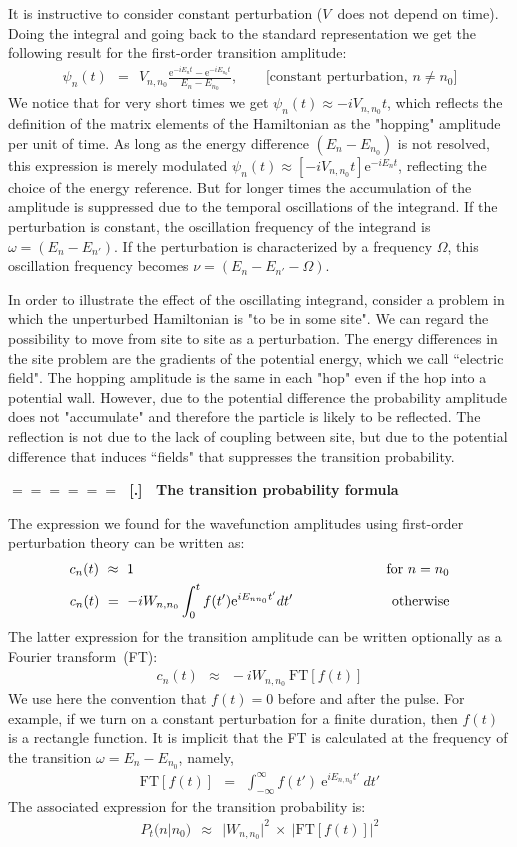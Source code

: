 \documentclass[onecolumn,fleqn]{revtex4}
\newcommand{\eexp}{\mathrm{e}^}
\newcommand{\beq}{\begin{eqnarray}}
\newcommand{\eeq}{\end{eqnarray}}
\renewcommand{\thesubsection}{\arabic{subsection}}
\renewcommand{\thesubsubsection}{\arabic{subsubsection}}
\newcommand{\sheadC}[1]
{
\addtocounter{subsubsection}{1}
\vspace{5mm}
{\Large\bf $=\!=\!=\!=\!=\!=\;$ [\thesubsection.\thesubsubsection] \ #1}  
\nopagebreak
\phantomsection
}
\begin{document}
It is instructive to consider constant perturbation ($V$~does not depend on time). 
Doing the integral and going back to the standard representation 
we get the following result for the first-order transition amplitude:
 \beq 
\psi_n(t) \ \ = \ \ V_{n,n_0}\frac{\eexp{-iE_{n}t}-\eexp{-iE_{n_0}t}}{E_{n}-E_{n_0}}, 
\ \ \ \ \ \ \ \ \ \mbox{[constant perturbation, $n \neq n_0$]}
\eeq
We notice that for very short times we get ${\psi_n(t) \approx -iV_{n,n_0} t}$, 
which reflects the definition of the matrix elements of the Hamiltonian as 
the "hopping" amplitude per unit of time. As long as the 
energy difference ${(E_n-E_{n_0})}$ is not resolved, 
this expression is merely modulated  ${\psi_n(t) \approx [-iV_{n,n_0} t] \eexp{-iE_nt}}$,  
reflecting the choice of the energy reference.  
But for longer times the accumulation of the amplitude 
is suppressed due to the temporal oscillations of the integrand. 
If the perturbation is constant, the oscillation frequency 
of the integrand is ${\omega= (E_n-E_{n'})}$. 
If the perturbation is characterized by a frequency $\Omega$, 
this oscillation frequency becomes ${\nu = (E_n-E_{n'}-\Omega)}$.

In order to illustrate the effect of the oscillating integrand, consider 
a problem in which the unperturbed Hamiltonian is "to be in some site". 
We can regard the possibility to move from site to site as a perturbation. 
The energy differences in the site problem are the gradients 
of the potential energy, which we call ``electric field". 
The hopping amplitude is the same in each "hop" even if the hop 
into a potential wall. However, due to the potential difference 
the probability amplitude does not "accumulate" and therefore 
the particle is likely to be reflected. The reflection is not due 
to the lack of coupling between site, but due to the potential 
difference that induces ``fields" that suppresses the transition probability. 


\sheadC{The transition probability formula}

The expression we found for the wavefunction amplitudes  
using first-order perturbation theory can be written as:
\beq
c_n(t) \ \approx \ 1  \hspace*{6cm}  &&  \mbox{for} \ n=n_0
\\ 
c_n(t) \  = \ -i W_{n,n_0} \int_0^t f(t') \eexp{i E_{nn_0} t'} dt' \hspace{2cm} && \mbox{otherwise} 
\eeq
The latter expression for the transition amplitude 
can be written optionally as a Fourier transform~(FT):  
\beq
c_n(t) \ \ \approx \ \  -iW_{n,n_0} \ \mbox{FT} \left[ f(t) \right] 
\eeq
We use here the convention that ${f(t)=0}$ before and after the pulse. 
For example, if we turn on a constant perturbation for a finite duration, 
then ${f(t)}$ is a rectangle function.
It is implicit that the FT is calculated at the 
frequency of the transition ${\omega=E_n-E_{n_0}}$, namely, 
\beq
\mbox{FT} \left[f(t)\right] \ \ = \ \ \int_{-\infty}^{\infty}f(t') \ \eexp{iE_{n,n_0} t'} \ dt' 
\eeq
The associated expression for the transition probability is:
\beq
P_t(n|n_0) \ \  \approx \ \  |W_{n,n_0}|^2 \ \times \ \Big| \mbox{FT} \left[ f(t) \right] \Big|^2 
\eeq
\end{document}

